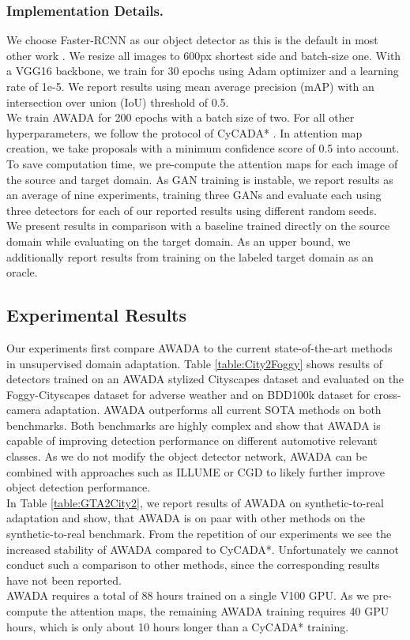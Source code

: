 \documentclass[10pt,twocolumn,letterpaper]{article}
\begin{document}
\subsubsection{Implementation Details.}
We choose Faster-RCNN as our object detector as this is the default in most other work \cite{DAFasterRCNN,StrongWeak,ProgressiveDomainAdaptation,SeekingSimilarities,iFAN,CDN}. We resize all images to 600px shortest side and batch-size one. With a VGG16 \cite{VGG} backbone, we train for 30 epochs using Adam optimizer and a learning rate of 1e-5. We report results using mean average precision (mAP) with an intersection over union (IoU) threshold of 0.5.\\
We train AWADA for 200 epochs with a batch size of two. For all other hyperparameters, we follow the protocol of CyCADA* \cite{menke2022}. In attention map creation, we take proposals with a minimum confidence score of 0.5 into account. To save computation time, we pre-compute the attention maps for each image of the source and target domain. As GAN training is instable, we report results as an average of nine experiments, training three GANs and evaluate each using three detectors for each of our reported results using different random seeds.\\
We present results in comparison with a baseline trained directly on the source domain while evaluating on the target domain. As an upper bound, we additionally report results from training on the labeled target domain as an oracle. 

\subsection{Experimental Results}
Our experiments first compare AWADA to the current state-of-the-art methods in unsupervised domain adaptation. Table \ref{table:City2Foggy} shows results of detectors trained on an AWADA stylized Cityscapes dataset and evaluated on the Foggy-Cityscapes dataset for adverse weather and on BDD100k dataset for cross-camera adaptation. AWADA outperforms all current SOTA methods on both benchmarks. Both benchmarks are highly complex and show that AWADA is capable of improving detection performance on different automotive relevant classes. As we do not modify the object detector network, AWADA can be combined with approaches such as ILLUME or CGD to likely further improve object detection performance. \\
In Table \ref{table:GTA2City2}, we report results of AWADA on synthetic-to-real adaptation and show, that AWADA is on paar with other methods on the synthetic-to-real benchmark. From the repetition of our experiments we see the increased stability of AWADA compared to CyCADA*. Unfortunately we cannot conduct such a comparison to other methods, since the corresponding results have not been reported. \\
AWADA requires a total of 88 hours trained on a single V100 GPU. As we pre-compute the attention maps, the remaining AWADA training requires 40 GPU hours, which is only about 10 hours longer than a CyCADA* training.
\end{document}
